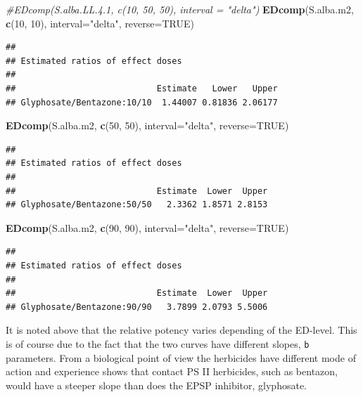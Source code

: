 \documentclass[letterpaper,]{book}
\newenvironment{Shaded}{\begin{snugshade}}{\end{snugshade}}
\newcommand{\CommentTok}[1]{\textcolor[rgb]{0.56,0.35,0.01}{\textit{#1}}}
\newcommand{\DataTypeTok}[1]{\textcolor[rgb]{0.13,0.29,0.53}{#1}}
\newcommand{\DecValTok}[1]{\textcolor[rgb]{0.00,0.00,0.81}{#1}}
\newcommand{\KeywordTok}[1]{\textcolor[rgb]{0.13,0.29,0.53}{\textbf{#1}}}
\newcommand{\NormalTok}[1]{#1}
\newcommand{\OtherTok}[1]{\textcolor[rgb]{0.56,0.35,0.01}{#1}}
\newcommand{\StringTok}[1]{\textcolor[rgb]{0.31,0.60,0.02}{#1}}
\begin{document}
\begin{Shaded}
\begin{Highlighting}[]
\CommentTok{#EDcomp(S.alba.LL.4.1, c(10, 50, 50), interval = "delta")}
\KeywordTok{EDcomp}\NormalTok{(S.alba.m2, }\KeywordTok{c}\NormalTok{(}\DecValTok{10}\NormalTok{, }\DecValTok{10}\NormalTok{), }\DataTypeTok{interval=}\StringTok{"delta"}\NormalTok{, }\DataTypeTok{reverse=}\OtherTok{TRUE}\NormalTok{)}
\end{Highlighting}
\end{Shaded}

\begin{verbatim}
## 
## Estimated ratios of effect doses
## 
##                            Estimate   Lower   Upper
## Glyphosate/Bentazone:10/10  1.44007 0.81836 2.06177
\end{verbatim}

\begin{Shaded}
\begin{Highlighting}[]
\KeywordTok{EDcomp}\NormalTok{(S.alba.m2, }\KeywordTok{c}\NormalTok{(}\DecValTok{50}\NormalTok{, }\DecValTok{50}\NormalTok{), }\DataTypeTok{interval=}\StringTok{"delta"}\NormalTok{, }\DataTypeTok{reverse=}\OtherTok{TRUE}\NormalTok{)}
\end{Highlighting}
\end{Shaded}

\begin{verbatim}
## 
## Estimated ratios of effect doses
## 
##                            Estimate  Lower  Upper
## Glyphosate/Bentazone:50/50   2.3362 1.8571 2.8153
\end{verbatim}

\begin{Shaded}
\begin{Highlighting}[]
\KeywordTok{EDcomp}\NormalTok{(S.alba.m2, }\KeywordTok{c}\NormalTok{(}\DecValTok{90}\NormalTok{, }\DecValTok{90}\NormalTok{), }\DataTypeTok{interval=}\StringTok{"delta"}\NormalTok{, }\DataTypeTok{reverse=}\OtherTok{TRUE}\NormalTok{)}
\end{Highlighting}
\end{Shaded}

\begin{verbatim}
## 
## Estimated ratios of effect doses
## 
##                            Estimate  Lower  Upper
## Glyphosate/Bentazone:90/90   3.7899 2.0793 5.5006
\end{verbatim}

It is noted above that the relative potency varies depending of the ED-level. This is of course due to the fact that the two curves have different slopes, \texttt{b} parameters. From a biological point of view the herbicides have different mode of action and experience shows that contact PS II herbicides, such as bentazon, would have a steeper slope than does the EPSP inhibitor, glyphosate.
\end{document}
